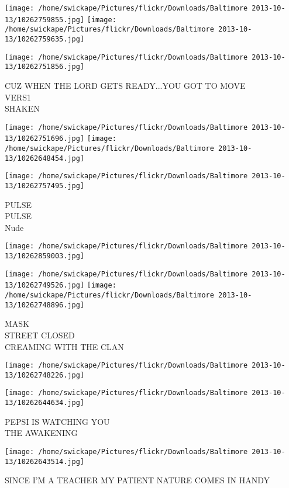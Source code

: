\documentclass[10pt,letterpaper]{article}
\begin{document}
\texttt{[image: /home/swickape/Pictures/flickr/Downloads/Baltimore 2013-10-13/10262759855.jpg]}
\texttt{[image: /home/swickape/Pictures/flickr/Downloads/Baltimore 2013-10-13/10262759635.jpg]}

\vspace{0.25in}
\texttt{[image: /home/swickape/Pictures/flickr/Downloads/Baltimore 2013-10-13/10262751856.jpg]}

CUZ WHEN THE LORD GETS READY...YOU GOT TO MOVE\\
VERS1\\
SHAKEN
\pagebreak

\texttt{[image: /home/swickape/Pictures/flickr/Downloads/Baltimore 2013-10-13/10262751696.jpg]}
\texttt{[image: /home/swickape/Pictures/flickr/Downloads/Baltimore 2013-10-13/10262648454.jpg]}

\vspace{0.25in}
\texttt{[image: /home/swickape/Pictures/flickr/Downloads/Baltimore 2013-10-13/10262757495.jpg]}

PULSE\\
PULSE\\
Nude
\pagebreak

\texttt{[image: /home/swickape/Pictures/flickr/Downloads/Baltimore 2013-10-13/10262859003.jpg]}

\vspace{0.25in}
\texttt{[image: /home/swickape/Pictures/flickr/Downloads/Baltimore 2013-10-13/10262749526.jpg]}
\texttt{[image: /home/swickape/Pictures/flickr/Downloads/Baltimore 2013-10-13/10262748896.jpg]}

MASK\\
STREET CLOSED\\
CREAMING WITH THE CLAN
\pagebreak

\texttt{[image: /home/swickape/Pictures/flickr/Downloads/Baltimore 2013-10-13/10262748226.jpg]}

\vspace{0.25in}
\texttt{[image: /home/swickape/Pictures/flickr/Downloads/Baltimore 2013-10-13/10262644634.jpg]}

PEPSI IS WATCHING YOU\\
THE AWAKENING
\pagebreak

\texttt{[image: /home/swickape/Pictures/flickr/Downloads/Baltimore 2013-10-13/10262643514.jpg]}

SINCE I'M A TEACHER MY PATIENT NATURE COMES IN HANDY
\pagebreak
\end{document}
